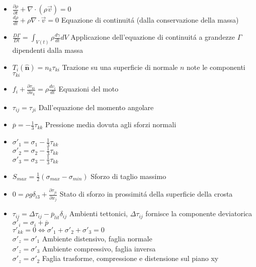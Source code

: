 \documentclass[a4paper]{article}
\begin{document}
\begin{itemize}
	\item $\frac{\partial \rho}{\partial t} + \nabla \cdot (\rho \overrightarrow{v}) = 0$ \\
	$\frac{d \rho}{d t} + \rho \nabla \cdot \overrightarrow{v} = 0$  \hspace{0.3cm} Equazione di continuit\'a (dalla conservazione della massa)
	
	\item $\frac{D \Gamma}{Dt}= \int_{V(t)} \rho \frac{d \gamma}{dt} dV $ Applicazione dell'equazione di continuit\'a a grandezze $ \Gamma$ dipendenti dalla massa
	
	\item $T_i(\hat{\textbf{n}})=n_k \tau_{ki}$ Trazione su una superficie di normale $n$ note le componenti $\tau_{ki}$
	
	\item $f_i + \frac{\partial \tau_{ki}}{\partial x_k} = \rho \frac{dv_i}{dt}$ Equazioni del moto
	
	\item $\tau_{ij} = \tau_{ji}$ Dall'equazione del momento angolare
	
	\item $\overline{p}=-\frac{1}{3}\tau_{kk}$ Pressione media dovuta agli sforzi normali
	
	\item $\sigma'_1=\sigma_1-\frac{1}{3}\tau_{kk}$\\
	$\sigma'_2=\sigma_2-\frac{1}{3}\tau_{kk}$\\
	$\sigma'_3=\sigma_3-\frac{1}{3}\tau_{kk}$\\
	
	\item $S_{max}=\frac{1}{2}(\sigma_{max}-\sigma_{min})$ Sforzo di taglio massimo
	
	\item $0=\rho g \delta_{i3}+ \frac{\partial \tau_{ji}}{\partial x_j}$ Stato di sforzo in prossimit\'a della superficie della crosta
	
	\item $\tau_{ij} = \Delta \tau_{ij}-\overline{p}_{lit} \delta_{ij}$ Ambienti tettonici, $\Delta \tau_{ij}$ fornisce la componente deviatorica\\
	$\sigma'_i=\sigma_i+\overline{p}$\\
	$\tau'_{kk}=0 \iff \sigma'_1 + \sigma'_2 +\sigma'_3 =0$\\
	$\sigma'_z=\sigma'_1$ Ambiente distensivo, faglia normale\\
	$\sigma'_z=\sigma'_3$ Ambiente compressivo, faglia inversa\\
	$\sigma'_z=\sigma'_2$ Faglia trasforme, compressione e distensione sul piano xy\\
	

\end{itemize}
\end{document}
